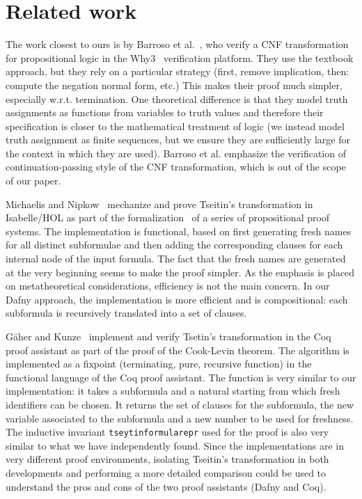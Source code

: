 \chapter{Related work}

The work closest to ours is by Barroso et
al.~\cite{DBLP:journals/corr/abs-2003-05081}, who verify a CNF
transformation for propositional logic in the Why3~\cite{why3}
verification platform. They use the textbook approach, but they rely
on a particular strategy (first, remove implication, then: compute the
negation normal form, etc.) This makes their proof much simpler,
especially w.r.t. termination. One theoretical difference is that they
model truth assignments as functions from variables to truth values
and therefore their specification is closer to the mathematical
treatment of logic (we instead model truth assignment as finite
sequences, but we ensure they are sufficiently large for the context
in which they are used). Barroso et al. emphasize the verification of
continuation-passing style of the CNF transformation, which is out of
the scope of our paper.

Michaelis and Nipkow~\cite{DBLP:conf/types/MichaelisN17} mechanize and
prove Tseitin's transformation in Isabelle/HOL as part of the
formalization~\cite{Propositional_Proof_Systems-AFP} of a series of
propositional proof systems. The implementation is functional, based
on first generating fresh names for all distinct subformulae and then
adding the corresponding clauses for each internal node of the input
formula. The fact that the fresh names are generated at the very
beginning seems to make the proof simpler. As the emphasis is placed
on metatheoretical considerations, efficiency is not the main
concern. In our Dafny approach, the implementation is more efficient
and is compositional: each subformula is recursively translated into a
set of clauses.

G\"{a}her and Kunze~\cite{gaher_et_al:LIPIcs.ITP.2021.20} implement
and verify Tsetin's transformation in the Coq proof assistant as part
of the proof of the Cook-Levin theorem. The algorithm is implemented
as a fixpoint (terminating, pure, recursive function) in the
functional language of the Coq proof assistant. The function is very
similar to our implementation: it takes a subformula and a natural
starting from which fresh identifiers can be chosen. It returns the
set of clauses for the subformula, the new variable associated to the
subformula and a new number to be used for freshness. The inductive
invariant \texttt{tseytin\textunderscore formula\textunderscore repr}
used for the proof is also very similar to what we have independently
found. Since the implementations are in very different proof
environments, isolating Tseitin's transformation in both developments
and performing a more detailed comparison could be used to understand
the pros and cons of the two proof assistants (Dafny and Coq).

